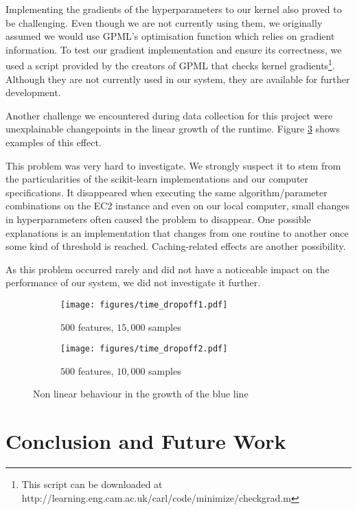 \documentclass[a4paper,12pt,twoside,openright]{report}
\begin{document}
Implementing the gradients of the hyperparameters to our kernel also proved to be challenging. Even though we are not currently using them, we originally assumed we would use GPML's optimisation function which relies on gradient information. To test our gradient implementation and ensure its correctness, we used a script provided by the creators of GPML that checks kernel gradients\footnote{This script can be downloaded at http://learning.eng.cam.ac.uk/carl/code/minimize/checkgrad.m}. Although they are not currently used in our system, they are available for further development.

Another challenge we encountered during data collection for this project were unexplainable changepoints in the linear growth of the runtime. Figure \ref{time_hinge} shows examples of this effect.

This problem was very hard to investigate. We strongly suspect it to stem from the particularities of the scikit-learn implementations and our computer specifications. It  disappeared when executing the same algorithm/parameter combinations on the EC2 instance and even on our local computer, small changes in hyperparameters often caused the problem to disappear. One possible explanations is an implementation that changes from one routine to another once some kind of threshold is reached. Caching-related effects are another possibility.

As this problem occurred rarely and did not have a noticeable impact on the performance of our system, we did not investigate it further.


\begin{figure}
\centering
\begin{subfigure}{.45\textwidth}
  \centering
  \texttt{[image: figures/time\_dropoff1.pdf]}
  \caption{$500$ features, $15,000$ samples}
  \label{time_dropoff1}
\end{subfigure}%
\begin{subfigure}{.45\textwidth}
  \centering
  \texttt{[image: figures/time\_dropoff2.pdf]}
  \caption{$500$ features, $10,000$ samples}
  \label{time_dropoff2}
\end{subfigure}
\caption{Non linear behaviour in the growth of the blue line}
\label{time_hinge}
\end{figure}




\chapter{Conclusion and Future Work} 
\end{document}
